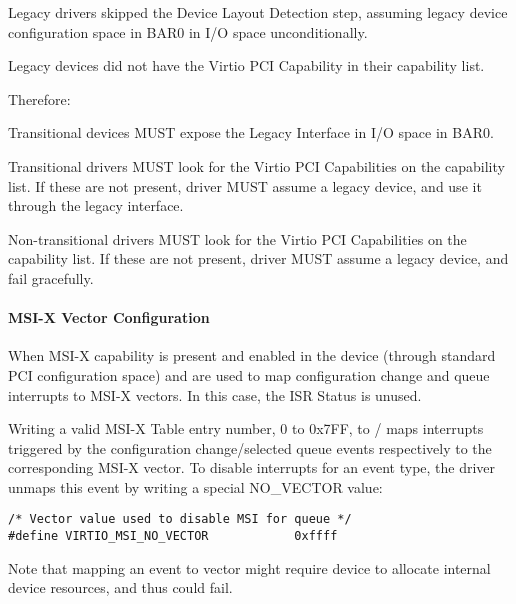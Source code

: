 Legacy drivers skipped the Device Layout Detection step, assuming legacy
device configuration space in BAR0 in I/O space unconditionally.

Legacy devices did not have the Virtio PCI Capability in their
capability list.

Therefore:

Transitional devices MUST expose the Legacy Interface in I/O
space in BAR0.

Transitional drivers MUST look for the Virtio PCI
Capabilities on the capability list.
If these are not present, driver MUST assume a legacy device,
and use it through the legacy interface.

Non-transitional drivers MUST look for the Virtio PCI
Capabilities on the capability list.
If these are not present, driver MUST assume a legacy device,
and fail gracefully.

\paragraph{MSI-X Vector Configuration}\label{sec:Virtio Transport Options / Virtio Over PCI Bus / PCI-specific Initialization And Device Operation / Device Initialization / MSI-X Vector Configuration}

When MSI-X capability is present and enabled in the device
(through standard PCI configuration space)  and  are used to map configuration change and queue
interrupts to MSI-X vectors. In this case, the ISR Status is unused.

Writing a valid MSI-X Table entry number, 0 to 0x7FF, to
/ maps interrupts triggered
by the configuration change/selected queue events respectively to
the corresponding MSI-X vector. To disable interrupts for an
event type, the driver unmaps this event by writing a special NO_VECTOR
value:

\begin{lstlisting}
/* Vector value used to disable MSI for queue */
#define VIRTIO_MSI_NO_VECTOR            0xffff
\end{lstlisting}

Note that mapping an event to vector might require device to
allocate internal device resources, and thus could fail. 


